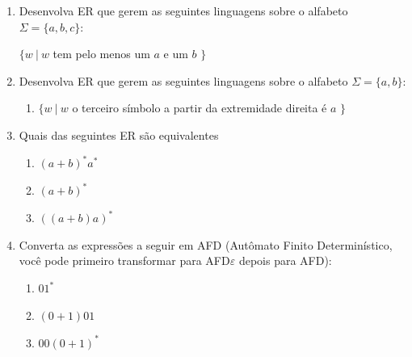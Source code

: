 \documentclass[12pt]{article}
\def\ve{\varepsilon}
\begin{document}
\begin{enumerate}
\item Desenvolva ER que gerem as seguintes linguagens sobre o alfabeto $\Sigma = \{a,b,c\}$:

$\{w~|~w $ tem pelo menos um $a$ e um $b$ $\}$


\item Desenvolva ER que gerem as seguintes linguagens sobre o alfabeto $\Sigma = \{a,b\}$:

\begin{enumerate}

\item $\{w~|~w$ o terceiro símbolo a partir da extremidade direita é $a$ $\}$





\end{enumerate}




\item Quais das seguintes ER são equivalentes

\begin{enumerate}

\item $(a+b)^*a^*$
\item $(a+b)^*$
\item $((a+b)a)^*$


\end{enumerate}



\item Converta as expressões a seguir em AFD (Autômato Finito Determinístico, você pode primeiro transformar para AFD$\ve$ depois para AFD):

\begin{enumerate}

\item $01^*$

\item $(0+1)01$

\item $00(0+1)^*$


\end{enumerate}
\end{enumerate}
\end{document}
